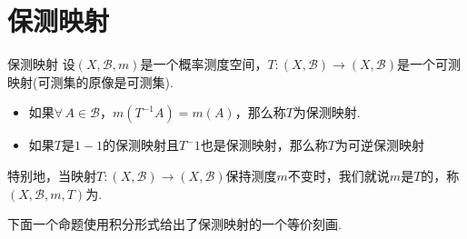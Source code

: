 \section{保测映射}

\begin{definition}{保测映射}
    设$(X,\mathcal{B},m)$是一个概率测度空间，$T:(X,\mathcal{B}) \to (X,\mathcal{B})$是一个可测映射(可测集的原像是可测集).
    \begin{itemize}
        \item 如果$\forall\, A\in\mathcal{B}$，$m(T^{-1}A)=m(A)$，那么称$T$为保测映射.
        \item 如果$T$是$1-1$的保测映射且$T^-1$也是保测映射，那么称$T$为可逆保测映射
    \end{itemize}
\end{definition}
特别地，当映射$T:(X,\mathcal{B}) \to (X,\mathcal{B})$保持测度$m$不变时，我们就说$m$是$T$的，称$(X,\mathcal{B},m,T)$为.\par
下面一个命题使用积分形式给出了保测映射的一个等价刻画.

